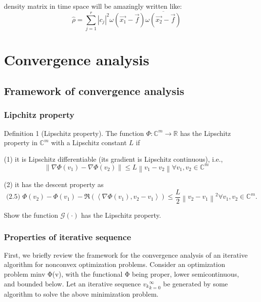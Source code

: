 \documentclass{article}
\numberwithin{equation}{section}
\begin{document}
density matrix in time space will be amazingly written like:
$$
\hat{\rho} = \sum_{j=1}^{r}\left|c_{j}\right|^{2} \omega(\overrightarrow{x_1} - \overrightarrow{f}) \overline { \omega(\overrightarrow{x_2} - \overrightarrow{f})}
$$ 
 
 
 \section{Convergence analysis}
 \subsection{Framework of convergence analysis}
 \subsubsection{Lipchitz property}
 Definition 1 (Lipschitz property). The function $\Phi: \mathbb{C}^{m} \rightarrow \mathbb{R}$ has the Lipschitz property in $\mathbb{C}^{m}$ with a Lipschitz constant $L$ if
 
 (1) it is Lipschitz differentiable (its gradient is Lipschitz continuous), i.e.,
 \begin{equation}
 	\left\|\nabla \Phi\left(v_{1}\right)-\nabla \Phi\left(v_{2}\right)\right\| \leq L\left\|v_{1}-v_{2}\right\| \forall v_{1}, v_{2} \in \mathbb{C}^{m}
 	\label{eq:lp(1)}
 \end{equation}
 
 
 (2) it has the descent property as
 \begin{equation}
 	 \text { (2.5) } \Phi\left(v_{2}\right)-\Phi\left(v_{1}\right)-\Re\left(\left\langle\nabla \Phi\left(v_{1}\right), v_{2}-v_{1}\right\rangle\right) \leq \frac{L}{2}\left\|v_{2}-v_{1}\right\|^{2} \forall v_{1}, v_{2} \in \mathbb{C}^{m} .
 	 \label{eq:lp(2)}
 \end{equation}

 


Show the function $\mathcal{G}(\cdot)$ has the Lipschitz property.

\subsubsection{Properties of iterative sequence}
First, we briefly review the framework for the convergence analysis of an iterative algorithm for nonconvex optimization problems. Consider an optimization problem minv Φ(v), with the functional Φ being proper, lower semicontinuous, and bounded below. Let an iterative sequence ${v_k}_{k=0}^{\infty}$ be generated by some algorithm to solve the above minimization problem.
\end{document}
